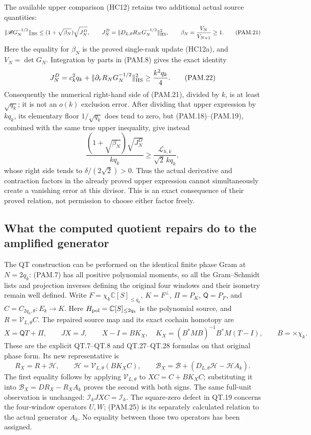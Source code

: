 The available upper comparison (HC12) retains two additional actual
source quantities:
\[
 \|\mathscr B G_N^{-1/2}\|_{\rm HS}
 \le(1+\sqrt{\beta_N})\sqrt{J_N^D},\qquad
 J_N^D=\|D_{L,\theta}R_NG_N^{-1/2}\|_{\rm HS}^2,\qquad
 \beta_N=\frac{V_N}{V_{N+1}}\ge1 .
 \tag{PAM.21}\label{CFStage:eq:pam-upper}
\]
Here the equality for \(\beta_N\) is the proved single-rank update
(HC12a), and \(V_N=\det G_N\). Integration by parts in (PAM.8)
gives the exact identity
\[
 J_N^D=c_k^2q_k+
       \|\partial_rR_NG_N^{-1/2}\|_{\rm HS}^2
       \ge\frac{k^2q_k}{4}.
 \tag{PAM.22}\label{CFStage:eq:pam-derivative}
\]
Consequently the numerical right-hand side of (PAM.21), divided
by \(k\), is at least \(\sqrt{q_k}\); it is not an
\(o(k)\) exclusion error. After dividing that upper expression by
\(kq_k\), its elementary floor \(1/\sqrt{q_k}\) does tend to zero,
but (PAM.18)--(PAM.19), combined with the same true upper inequality,
give instead
\[
 \frac{(1+\sqrt{\beta_N})\sqrt{J_N^D}}{kq_k}
 \ge\frac{\mathcal L_{h,k}}{\sqrt2\,kq_k},
 \tag{PAM.23}\label{CFStage:eq:pam-combinedupper}
\]
whose right side tends to \(\delta/(2\sqrt2)>0\).
Thus the actual derivative and contraction factors in the already
proved upper expression cannot simultaneously create a vanishing
error at this divisor. This is an exact consequence of their
proved relation, not permission to choose either factor freely.

\subsection{What the computed quotient repairs do to the amplified generator}

The QT construction can be performed on the identical finite phase
Gram at \(N=2q_k\): (PAM.7) has all positive polynomial moments,
so all the Gram--Schmidt lists and projection inverses defining
the original four windows and their isometry remain well defined.
Write \(F=\chi_k\mathbb C[S]_{\le q_k}\),
\(K=F^\perp\), \(\Pi=P_K\), \(\mathsf Q=P_F\), and
\(C=C_{2q_k,\theta}:E_k\to K\).
Here \(H_{\rm pol}=\mathbb C[S]_{\le2q_k}\) is the polynomial
source, and \(R=\mathcal V_{L,\theta}C\).
The repaired source map and its exact cochain homotopy are
\[
 X=\mathsf QT+\Pi,\qquad JX=J,\qquad
 X-I=B K_X,\quad
 K_X=(B^*MB)^{-1}B^*M(T-I),\qquad B=\times\chi_k .
 \tag{PAM.24}\label{CFStage:eq:pam-repair}
\]
These are the explicit QT.7--QT.8 and QT.27--QT.28 formulas
on that original phase form. Its new representative is
\[
 R_X=R+\mathcal H,\qquad
 \mathcal H=\mathcal V_{L,\theta}(B K_XC),\qquad
 \mathscr B_X
 =\mathscr B+(D_{L,\theta}\mathcal H-\mathcal H A_k).
 \tag{PAM.25}\label{CFStage:eq:pam-repairboundary}
\]
The first equality follows by applying \(\mathcal V_{L,\theta}\)
to \(XC=C+BK_XC\); substituting it into
\(\mathscr B_X=DR_X-R_XA_k\) proves the second with both signs.
The same full-unit observation is unchanged:
\(\mathcal I_kJXC=\mathcal I_k\).
The square-zero defect in QT.19 concerns the four-window operators
\(U,W\); (PAM.25) is its separately calculated relation to the
actual generator \(A_k\). No equality between those two operators
has been assigned.

